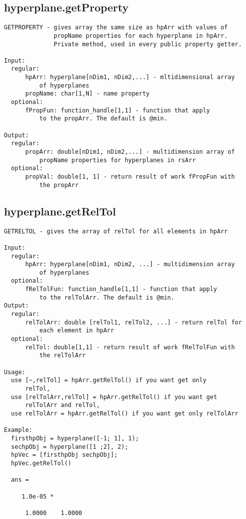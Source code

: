 \subsection{\texorpdfstring{hyperplane.getProperty}{getProperty}}\label{method:hyperplane.getProperty}
\begin{verbatim}
GETPROPERTY - gives array the same size as hpArr with values of
              propName properties for each hyperplane in hpArr.
              Private method, used in every public property getter.

Input:
  regular:
      hpArr: hyperplane[nDim1, nDim2,...] - mltidimensional array
          of hyperplanes
      propName: char[1,N] - name property
  optional:
      fPropFun: function_handle[1,1] - function that apply
          to the propArr. The default is @min.

Output:
  regular:
      propArr: double[nDim1, nDim2,...] - multidimension array of
          propName properties for hyperplanes in rsArr
  optional:
      propVal: double[1, 1] - return result of work fPropFun with
          the propArr
\end{verbatim}
\subsection{\texorpdfstring{hyperplane.getRelTol}{getRelTol}}\label{method:hyperplane.getRelTol}
\begin{verbatim}
GETRELTOL - gives the array of relTol for all elements in hpArr

Input:
  regular:
      hpArr: hyperplane[nDim1, nDim2, ...] - multidimension array
          of hyperplanes
  optional:
      fRelTolFun: function_handle[1,1] - function that apply
          to the relTolArr. The default is @min.
Output:
  regular:
      relTolArr: double [relTol1, relTol2, ...] - return relTol for
          each element in hpArr
  optional:
      relTol: double[1,1] - return result of work fRelTolFun with
          the relTolArr

Usage:
  use [~,relTol] = hpArr.getRelTol() if you want get only
      relTol,
  use [relTolArr,relTol] = hpArr.getRelTol() if you want get
      relTolArr and relTol,
  use relTolArr = hpArr.getRelTol() if you want get only relTolArr

Example:
  firsthpObj = hyperplane([-1; 1], 1);
  sechpObj = hyperplane([1 ;2], 2);
  hpVec = [firsthpObj sechpObj];
  hpVec.getRelTol()

  ans =

     1.0e-05 *

      1.0000    1.0000
\end{verbatim}
